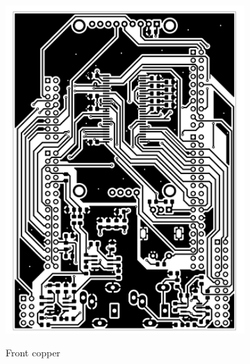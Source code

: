 \documentclass[a4paper,twoside,12pt]{book}
\begin{document}
\begin{figure}[H]
    \centering
    \begin{subfigure}[h]{0.273\textwidth}
        \includegraphics[width=\textwidth]{images/Board_front}
        \label{fig:board1}
        \caption{Front copper}
    \end{subfigure}
    ~
    \begin{subfigure}[h]{0.273\textwidth}

\end{subfigure}
\end{figure}
\end{document}
